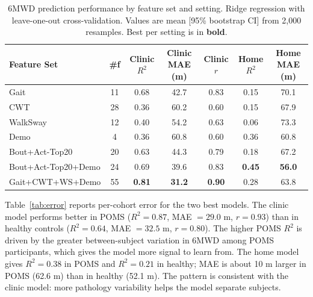 \documentclass{article}
\begin{document}
\begin{table}[!ht]
\centering
\caption{6MWD prediction performance by feature set and setting. Ridge regression with leave-one-out cross-validation. Values are mean [95\% bootstrap CI] from 2{,}000 resamples. Best per setting is in \textbf{bold}.}
\label{tab:results}
\small
\begin{tabular}{@{}lcccccc@{}}
\toprule
Feature Set & \#f & Clinic $R^2$ & Clinic MAE (m) & Clinic $r$ & Home $R^2$ & Home MAE (m) \\
\midrule
Gait                 & 11 & 0.68 & 42.7 & 0.83 & 0.15 & 70.1 \\
CWT                  & 28 & 0.36 & 60.2 & 0.60 & 0.15 & 67.9 \\
WalkSway             & 12 & 0.40 & 54.2 & 0.63 & 0.06 & 73.3 \\
Demo                 & 4  & 0.36 & 60.8 & 0.60 & 0.36 & 60.8 \\
Bout+Act-Top20       & 20 & 0.63 & 44.3 & 0.79 & 0.18 & 67.2 \\
Bout+Act-Top20+Demo  & 24 & 0.69 & 39.6 & 0.83 & \textbf{0.45} & \textbf{56.0} \\
Gait+CWT+WS+Demo     & 55 & \textbf{0.81} & \textbf{31.2} & \textbf{0.90} & 0.28 & 63.8 \\
\bottomrule
\end{tabular}
\end{table}

Table~\ref{tab:error} reports per-cohort error for the two best models. The clinic model performs better in POMS ($R^2 = 0.87$, MAE $= 29.0$ m, $r = 0.93$) than in healthy controls ($R^2 = 0.64$, MAE $= 32.5$ m, $r = 0.80$). The higher POMS $R^2$ is driven by the greater between-subject variation in 6MWD among POMS participants, which gives the model more signal to learn from. The home model gives $R^2 = 0.38$ in POMS and $R^2 = 0.21$ in healthy; MAE is about 10 m larger in POMS (62.6 m) than in healthy (52.1 m). The pattern is consistent with the clinic model: more pathology variability helps the model separate subjects.
\end{document}
